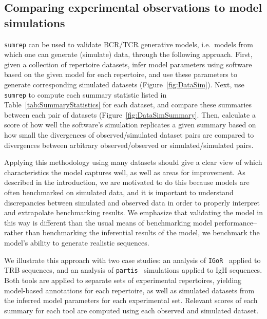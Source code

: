 \documentclass{article}
\newcommand{\partis}{\texttt{partis}}
\newcommand{\igor}{\texttt{IGoR}}
\begin{document}
\subsection*{Comparing experimental observations to model simulations}
\texttt{sumrep} can be used to validate BCR/TCR generative models, i.e.\ models from which one can generate (simulate) data, through the following approach.
First, given a collection of repertoire datasets, infer model parameters using software based on the given model for each repertoire, and use these parameters to generate corresponding simulated datasets (Figure~\ref{fig:DataSim}).
Next, use \texttt{sumrep} to compute each summary statistic listed in Table~\ref{tab:SummaryStatistics} for each dataset, and compare these summaries between each pair of datasets (Figure~\ref{fig:DataSimSummary}.
Then, calculate a score of how well the software's simulation replicates a given summary based on how small the divergences of observed/simulated dataset pairs are compared to divergences between arbitrary observed/observed or simulated/simulated pairs.

Applying this methodology using many datasets should give a clear view of which characteristics the model captures well, as well as areas for improvement.
As described in the introduction, we are motivated to do this because models are often benchmarked on simulated data, and it is important to understand discrepancies between simulated and observed data in order to properly interpret and extrapolate benchmarking results.
We emphasize that validating the model in this way is different than the usual means of benchmarking model performance-- rather than benchmarking the inferential results of the model, we benchmark the model's ability to generate realistic sequences.

We illustrate this approach with two case studies:
an analysis of \igor~\cite{Marcou2018-du} applied to TRB sequences, and an analysis of \partis~\cite{Ralph2016-nw, Ralph2016-iz} simulations applied to IgH sequences.
Both tools are applied to separate sets of experimental repertoires, yielding model-based annotations for each repertoire, as well as simulated datasets from the inferred model parameters for each experimental set.
Relevant scores of each summary for each tool are computed using each observed and simulated dataset.
\end{document}
